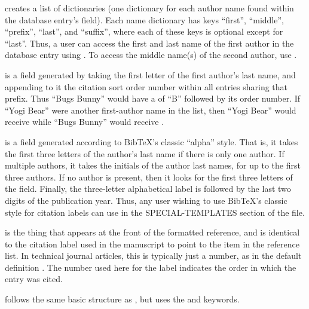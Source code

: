 \documentclass[letterpaper,10pt,english]{sphinxmanual}
\begin{document}
 creates a list of dictionaries (one dictionary for each author name found within the database entry’s  field). Each name dictionary has keys “first”, “middle”, “prefix”, “last”, and “suffix”, where each of these keys is optional except for “last”. Thus, a user can access the first and last name of the first author in the database entry using . To access the middle name(s) of the second author, use .

 is a field generated by taking the first letter of the first author’s last name, and appending to it the citation sort order number within all entries sharing that prefix. Thus “Bugs Bunny” would have a  of “B” followed by its order number. If “Yogi Bear” were another first-author name in the list, then “Yogi Bear” would receive  while “Bugs Bunny” would receive .

 is a field generated according to BibTeX’s classic “alpha” style. That is, it takes the first three letters of the author’s last name if there is only one author. If multiple authors, it takes the initials of the author last names, for up to the first three authors. If no author is present, then it looks for the first three letters of the  field. Finally, the three-letter alphabetical label is followed by the last two digits of the publication year. Thus, any user wishing to use BibTeX’s classic  style for citation labels can use  in the SPECIAL-TEMPLATES section of the file.

 is the thing that appears at the front of the formatted reference, and is identical to the citation label used in the manuscript to point to the item in the reference list. In technical journal articles, this is typically just a number, as in the default definition . The number used here for the label indicates the order in which the entry was cited.

 follows the same basic structure as , but uses the  and  keywords.
\end{document}

